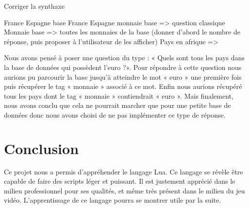 \documentclass[11pt,a4paper]{article}
\begin{document}
 
 
 
Corriger la synthaxe
 
France Espagne base
France Espagne monnaie base => question classique
Monnaie base => toutes les monnaies de la base  (donner d’abord le nombre de réponse, puis proposer à l’utilisateur de les afficher)
Pays en afrique =>
 
Nous avons pensé à poser une question du type : «  Quels sont tous les pays dans la base de données qui possèdent l’euro ?». Pour répondre à cette question nous aurions pu parcourir la base jusqu’à atteindre le mot « euro » une première fois puis  récupérer le tag « monnaie » associé à ce mot. Enfin nous aurions récupéré tous les pays dont le tag « monnaie » contiendrait « euro ». Mais finalement, nous avons conclu que cela ne pourrait marcher que pour une petite base de données donc nous avons choisi de ne pas implémenter ce type de réponse. 


\section{Conclusion}

Ce projet nous a permis d'appréhender le langage Lua. Ce langage se révèle être capable de faire des scripts léger et puissant. Il est justement apprécié dans le milieu professionnel pour ses qualités, et même très présent dans le milieu du jeu vidéo. L'apprentissage de ce langage pourra se montrer utile par la suite.
\end{document}
